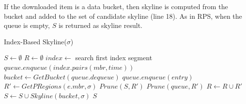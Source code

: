 If the downloaded item is a data bucket, then skyline is computed from the bucket and added to the set of candidate skyline (line 18). As in RPS, when the queue is empty, $S$ is returned as skyline result.

\begin{algorithm}
\caption{Index-Based Skyline($\sigma$)} \label{alg:IBSkyline}
\begin{algorithmic}[1]

\STATE $S \gets \emptyset$
\STATE $R \gets \emptyset$
\STATE $index \gets$ search first index segment
\STATE $queue.enqueue(index.pairs(mbr, time))$
    \STATE $bucket \gets GetBucket(queue.dequeue)$
                \STATE $queue.enqueue(entry)$
                \STATE $R' \gets GetPRegions(e.mbr, \sigma)$
                \STATE $Prune(S, R')$
                \STATE $Prune(queue, R')$
                \STATE $R \gets R \cup R'$
            \ENDIF
        \ENDFOR
    \ELSE
        \STATE $S \gets S \cup Skyline(bucket, \sigma)$
    \ENDIF
\ENDWHILE \RETURN $S$
\end{algorithmic}
\end{algorithm}

%



